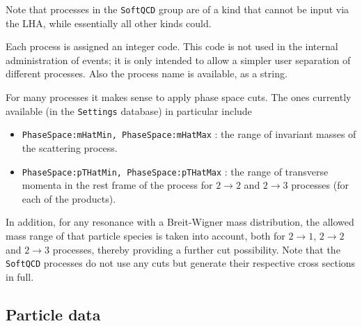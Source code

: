\documentclass{elsartmod}
\begin{document}
Note that processes in the \texttt{SoftQCD} group are of a kind 
that cannot be input via the LHA, while essentially all other kinds
could. 

Each process is assigned an integer code. This code is not used in
the internal administration of events; it is only intended to allow
a simpler user separation of different processes. Also the process 
name is available, as a string.

For many processes it makes sense to apply phase space cuts. The ones
currently available (in the \texttt{Settings} database) in particular
include
\begin{itemize}
\item \texttt{PhaseSpace:mHatMin, PhaseSpace:mHatMax} : 
the range of invariant masses of the scattering process.
\item \texttt{PhaseSpace:pTHatMin, PhaseSpace:pTHatMax} : 
the range of  transverse momenta in the rest frame of the 
process for $2 \to 2$ and $2 \to 3$ processes (for each of the 
products).
\end{itemize}
In addition, for any resonance with a Breit-Wigner mass distribution,
the allowed mass range of that particle species is taken into 
account, both for $2 \to 1$, $2 \to 2$ and $2 \to 3$ processes, 
thereby providing a further cut possibility. Note that the 
\texttt{SoftQCD} processes do not use any cuts but generate their 
respective cross sections in full.   

\subsection{Particle data}
\end{document}
